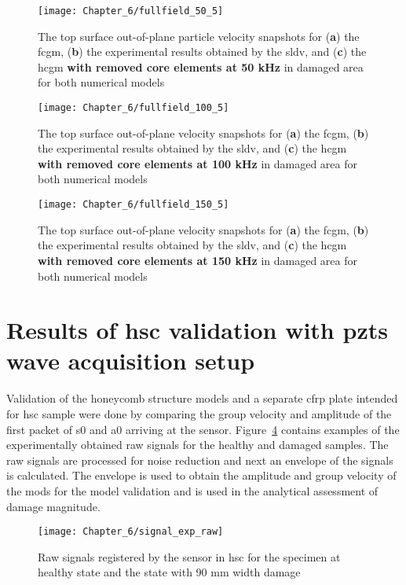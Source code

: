 \documentclass[11pt,a4paper,final]{report}
\theoremstyle{plain}
\begin{document}
\begin{figure}[!hbt]
	\begin{center}
		\texttt{[image: Chapter\_6/fullfield\_50\_5]}
	\end{center}
	\caption{The top surface out-of-plane particle velocity snapshots for (\textbf{a}) the \acf{fcgm}, (\textbf{b}) the experimental results obtained by the \acf{sldv}, and (\textbf{c}) the \acf{hcgm} \textbf{with removed core elements at 50 kHz} in damaged area for both numerical models}
	\label{fig:fullfield_50_5}
\end{figure}
\begin{figure}[!hbt]
	\begin{center}
		\texttt{[image: Chapter\_6/fullfield\_100\_5]}
	\end{center}
	\caption{The top surface out-of-plane velocity snapshots for (\textbf{a}) the \acf{fcgm}, (\textbf{b}) the experimental results obtained by the \acf{sldv}, and (\textbf{c}) the \acf{hcgm} \textbf{with removed core elements at 100 kHz} in damaged area for both numerical models}
	\label{fig:fullfield_100_5}
\end{figure}
\begin{figure}[!hbt]
	\begin{center}
		\texttt{[image: Chapter\_6/fullfield\_150\_5]}
	\end{center}
	\caption{The top surface out-of-plane velocity snapshots for (\textbf{a}) the \acf{fcgm}, (\textbf{b}) the experimental results obtained by the \acf{sldv}, and (\textbf{c}) the \acf{hcgm} \textbf{with removed core elements at 150 kHz} in damaged area for both numerical models}
	\label{fig:fullfield_150_5}
\end{figure}
\clearpage \section{Results of \acl{hsc} validation with \aclp{pzt} wave acquisition setup}
\label{sec:resuls_pzt}
Validation of the honeycomb structure models and a separate \ac{cfrp} plate intended for \ac{hsc} sample were done by comparing the group velocity and amplitude of the first packet of \ac{s0} and \ac{a0} arriving at the sensor.
Figure~\ref{fig:signal_exp_raw} contains examples of the experimentally obtained raw signals for the healthy and damaged samples.
The raw signals are processed for noise reduction and next an envelope of the signals is calculated.
The envelope is used to obtain the amplitude and group velocity of the mods for the model validation and is used in the analytical assessment of damage magnitude.
\begin{figure}[!htb]
	\begin{center}
		\texttt{[image: Chapter\_6/signal\_exp\_raw]}
	\end{center}
	\caption{Raw signals registered by the sensor in \acl{hsc} for the specimen at healthy state and the state with 90 \unit{\mm} width damage}
	\label{fig:signal_exp_raw}
\end{figure}
\end{document}
